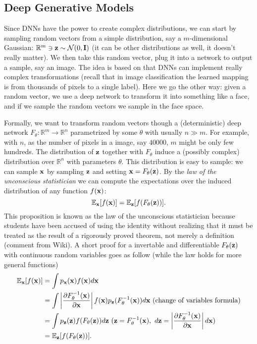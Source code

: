 \documentclass[../book-template.tex]{subfiles}
\begin{document}
\subsection{Deep Generative Models}
\par Since DNNs have the power to create complex distributions, we can start by sampling random vectors from a simple distribution, say a $m$-dimensional Gaussian: $\mathbb{R}^{m}\ni {\bf z}\sim \mathcal{N}(0,{\bf I})$ (it can be other distributions as well, it doesn't really matter). We then take this random vector, plug it into a network to output a sample, say an image. The idea is based on that DNNs can implement really complex transformations (recall that in image classification the learned mapping is from thousands of pixels to a single label). Here we go the other way: given a random vector, we use a deep network to transform it into something like a face, and if we sample the random vectors we sample in the face space. 
\par Formally, we want to transform random vectors though a (deterministic) deep network $F_{\theta}:\mathbb{R}^m\rightarrow\mathbb{R}^n$ parametrized by some $\theta$ with usually $n\gg m$. For example, with $n$, as the number of pixels in a image, say $40000$, $m$ might be only few hundreds. The distribution of ${\bf z}$ together with $F_{\theta}$ induce a (possibly complex) distribution over $\mathbb{R}^n$ with parameters $\theta$. This distribution is easy to sample: we can sample ${\bf x}$ by sampling ${\bf z}$ and setting ${\bf x}=F_{\theta}({\bf z})$. By the \emph{law of the unconscious statistician} we can compute the expectations over the induced distribution of any function $f({\bf x})$:
\begin{equation}\label{eq_8_lotus}
	\mathbb{E}_{\bf x}[f({\bf x})]=\mathbb{E}_{\bf z}[f(F_{\theta}({\bf z}))].
\end{equation}
This proposition is known as the law of the unconscious statistician because students have been accused of using the identity without realizing that it must be treated as the result of a rigorously proved theorem, not merely a definition (comment from Wiki). A short proof for a invertable and differentiable $F_{\theta}({\bf z})$ with continuous random variables goes as follow (while the law holds for more general functions)
\begin{align*}
	\mathbb{E}_{\bf x}[f({\bf x})]&=\int p_{\bf x}({\bf x})f({\bf x})d{\bf x}\\
		&=\int \left|\frac{\partial F_{\theta}^{-1}({\bf x})}{\partial {\bf x}} \right|f({\bf x})p_{\bf z} (F_{\theta}^{-1}({\bf x})) d{\bf x}\ \text{(change of variables formula)}\\
		&=\int p_{\bf z}({\bf z})f(F_{\theta}({\bf z}))d{\bf z}\ ({\bf z}=F_{\theta}^{-1}({\bf x}),\ d{\bf z}=\left|\frac{\partial F_{\theta}^{-1}({\bf x})}{\partial {\bf x}} \right|d{\bf x})\\
		&=\mathbb{E}_{\bf z}[f(F_{\theta}({\bf z}))].
\end{align*}
\end{document}

